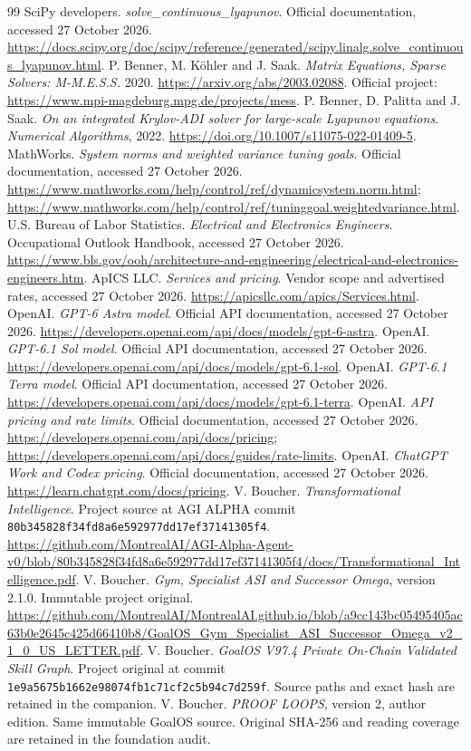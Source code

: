 \documentclass[11pt,letterpaper]{article}
\newcommand{\sourceid}{\texttt{80b345828f34fd8a6e592977dd17ef37141305f4}}
\begin{document}
\begin{thebibliography}{99}\small
{} SciPy developers. \emph{solve\_continuous\_lyapunov}. Official documentation, accessed 27 October 2026. \url{https://docs.scipy.org/doc/scipy/reference/generated/scipy.linalg.solve_continuous_lyapunov.html}.
 P. Benner, M. K\"ohler and J. Saak. \emph{Matrix Equations, Sparse Solvers: M-M.E.S.S.} 2020. \url{https://arxiv.org/abs/2003.02088}. Official project: \url{https://www.mpi-magdeburg.mpg.de/projects/mess}.
 P. Benner, D. Palitta and J. Saak. \emph{On an integrated Krylov-ADI solver for large-scale Lyapunov equations}. \emph{Numerical Algorithms}, 2022. \url{https://doi.org/10.1007/s11075-022-01409-5}.
 MathWorks. \emph{System norms and weighted variance tuning goals}. Official documentation, accessed 27 October 2026. \url{https://www.mathworks.com/help/control/ref/dynamicsystem.norm.html}; \url{https://www.mathworks.com/help/control/ref/tuninggoal.weightedvariance.html}.
 U.S. Bureau of Labor Statistics. \emph{Electrical and Electronics Engineers}. Occupational Outlook Handbook, accessed 27 October 2026. \url{https://www.bls.gov/ooh/architecture-and-engineering/electrical-and-electronics-engineers.htm}.
 ApICS LLC. \emph{Services and pricing}. Vendor scope and advertised rates, accessed 27 October 2026. \url{https://apicsllc.com/apics/Services.html}.
 OpenAI. \emph{GPT-6 Astra model}. Official API documentation, accessed 27 October 2026. \url{https://developers.openai.com/api/docs/models/gpt-6-astra}.
 OpenAI. \emph{GPT-6.1 Sol model}. Official API documentation, accessed 27 October 2026. \url{https://developers.openai.com/api/docs/models/gpt-6.1-sol}.
 OpenAI. \emph{GPT-6.1 Terra model}. Official API documentation, accessed 27 October 2026. \url{https://developers.openai.com/api/docs/models/gpt-6.1-terra}.
 OpenAI. \emph{API pricing and rate limits}. Official documentation, accessed 27 October 2026. \url{https://developers.openai.com/api/docs/pricing}; \url{https://developers.openai.com/api/docs/guides/rate-limits}.
 OpenAI. \emph{ChatGPT Work and Codex pricing}. Official documentation, accessed 27 October 2026. \url{https://learn.chatgpt.com/docs/pricing}.
 V. Boucher. \emph{Transformational Intelligence}. Project source at AGI ALPHA commit \sourceid. \url{https://github.com/MontrealAI/AGI-Alpha-Agent-v0/blob/80b345828f34fd8a6e592977dd17ef37141305f4/docs/Transformational_Intelligence.pdf}.
 V. Boucher. \emph{Gym, Specialist ASI and Successor Omega}, version 2.1.0. Immutable project original. \url{https://github.com/MontrealAI/MontrealAI.github.io/blob/a9cc143bc05495405ac63b0e2645c425d66410b8/GoalOS_Gym_Specialist_ASI_Successor_Omega_v2_1_0_US_LETTER.pdf}.
 V. Boucher. \emph{GoalOS V97.4 Private On-Chain Validated Skill Graph}. Project original at commit \texttt{1e9a5675b1662e98074fb1c71cf2c5b94c7d259f}. Source paths and exact hash are retained in the companion.
 V. Boucher. \emph{PROOF LOOPS}, version 2, author edition. Same immutable GoalOS source. Original SHA-256 and reading coverage are retained in the foundation audit.
\end{thebibliography}
\end{document}
